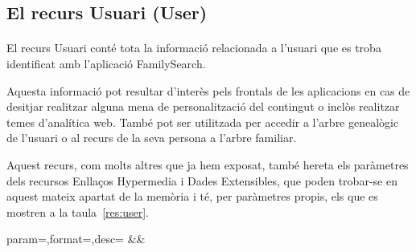 \subsection{El recurs Usuari (User)}

    \paragraph{}
    El recurs Usuari conté tota la informació relacionada a l'usuari que es troba identificat amb l'aplicació FamilySearch.

    Aquesta informació pot resultar d'interès pels frontals de les aplicacions en cas de desitjar realitzar alguna mena de personalització del contingut o inclòs realitzar temes d'analítica web. També pot ser utilitzada per accedir a l'arbre genealògic de l'usuari o al recurs de la seva persona a l'arbre familiar.

     Aquest recurs, com molts altres que ja hem exposat, també hereta els paràmetres dels recursos Enllaços Hypermedia i Dades Extensibles, que poden trobar-se en aquest mateix apartat de la memòria i té, per paràmetres propis, els que es mostren a la taula~\ref{res:user}.

     \begin{center}
              {param=\param,format=\format,desc=\desc}
              {\param&\format&\desc}
      \end{center}
